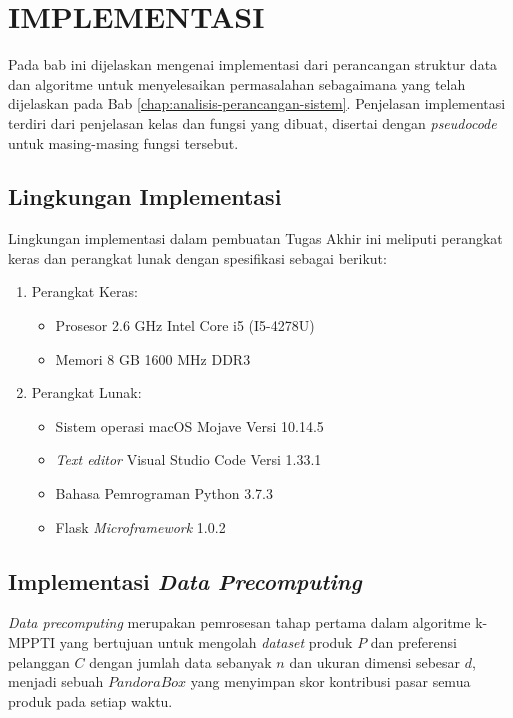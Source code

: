 \chapter{IMPLEMENTASI} \label{chap:implementasi}

\tab Pada bab ini dijelaskan mengenai implementasi dari perancangan struktur data dan algoritme untuk menyelesaikan permasalahan \problemDua{} sebagaimana yang telah dijelaskan pada Bab \ref{chap:analisis-perancangan-sistem}. Penjelasan implementasi terdiri dari penjelasan kelas dan fungsi yang dibuat, disertai dengan \textit{pseudocode} untuk masing-masing fungsi tersebut.

\section{Lingkungan Implementasi}
\tab Lingkungan implementasi dalam pembuatan Tugas Akhir ini meliputi perangkat keras dan perangkat lunak dengan spesifikasi sebagai berikut:

\begin{enumerate}
	\item Perangkat Keras:
	\begin{itemize}
		\item Prosesor 2.6 GHz Intel Core i5 (I5-4278U)
		\item Memori 8 GB 1600 MHz DDR3
	\end{itemize}
	\item Perangkat Lunak:
	\begin{itemize}
		\item Sistem operasi macOS Mojave Versi 10.14.5
		\item \textit{Text editor} Visual Studio Code Versi 1.33.1
		\item Bahasa Pemrograman Python 3.7.3
		\item Flask \textit{Microframework} 1.0.2
	\end{itemize}			
\end{enumerate}

\section{Implementasi \textit{Data Precomputing}}
\tab \textit{Data precomputing} merupakan pemrosesan tahap pertama dalam algoritme k-MPPTI yang bertujuan untuk mengolah \textit{dataset} produk $P$ dan preferensi pelanggan $C$ dengan jumlah data sebanyak $n$ dan ukuran dimensi sebesar $d$, menjadi sebuah $Pandora Box$ yang menyimpan skor kontribusi pasar semua produk pada setiap waktu. 

